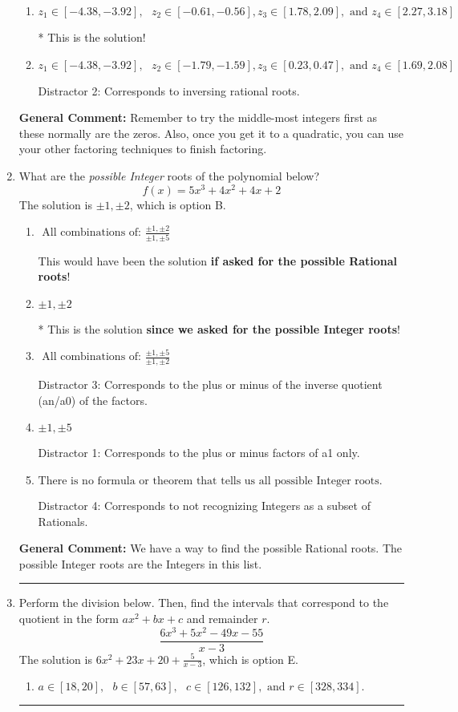 \documentclass{extbook}[14pt]
\newcommand{\litem}[1]{\item #1

\rule{\textwidth}{0.4pt}}
\begin{document}
\begin{enumerate}
{\begin{enumerate}[label=\Alph*.]
 Distractor 4: Corresponds to moving factors from one rational to another.
\item \( z_1 \in [-4.38, -3.92], \text{   }  z_2 \in [-0.61, -0.56], z_3 \in [1.78, 2.09], \text{   and   } z_4 \in [2.27, 3.18] \)

* This is the solution!
\item \( z_1 \in [-4.38, -3.92], \text{   }  z_2 \in [-1.79, -1.59], z_3 \in [0.23, 0.47], \text{   and   } z_4 \in [1.69, 2.08] \)

 Distractor 2: Corresponds to inversing rational roots.
\end{enumerate}

\textbf{General Comment:} Remember to try the middle-most integers first as these normally are the zeros. Also, once you get it to a quadratic, you can use your other factoring techniques to finish factoring.
}
\litem{
What are the \textit{possible Integer} roots of the polynomial below?
\[ f(x) = 5x^{3} +4 x^{2} +4 x + 2 \]The solution is \( \pm 1,\pm 2 \), which is option B.\begin{enumerate}[label=\Alph*.]
\item \( \text{ All combinations of: }\frac{\pm 1,\pm 2}{\pm 1,\pm 5} \)

This would have been the solution \textbf{if asked for the possible Rational roots}!
\item \( \pm 1,\pm 2 \)

* This is the solution \textbf{since we asked for the possible Integer roots}!
\item \( \text{ All combinations of: }\frac{\pm 1,\pm 5}{\pm 1,\pm 2} \)

 Distractor 3: Corresponds to the plus or minus of the inverse quotient (an/a0) of the factors. 
\item \( \pm 1,\pm 5 \)

 Distractor 1: Corresponds to the plus or minus factors of a1 only.
\item \( \text{There is no formula or theorem that tells us all possible Integer roots.} \)

 Distractor 4: Corresponds to not recognizing Integers as a subset of Rationals.
\end{enumerate}

\textbf{General Comment:} We have a way to find the possible Rational roots. The possible Integer roots are the Integers in this list.
}
\litem{
Perform the division below. Then, find the intervals that correspond to the quotient in the form $ax^2+bx+c$ and remainder $r$.
\[ \frac{6x^{3} +5 x^{2} -49 x -55}{x -3} \]The solution is \( 6x^{2} +23 x + 20 + \frac{5}{x -3} \), which is option E.\begin{enumerate}[label=\Alph*.]
\item \( a \in [18, 20], \text{   } b \in [57, 63], \text{   } c \in [126, 132], \text{   and   } r \in [328, 334]. \)


\end{enumerate}}
\end{enumerate}
\end{document}
